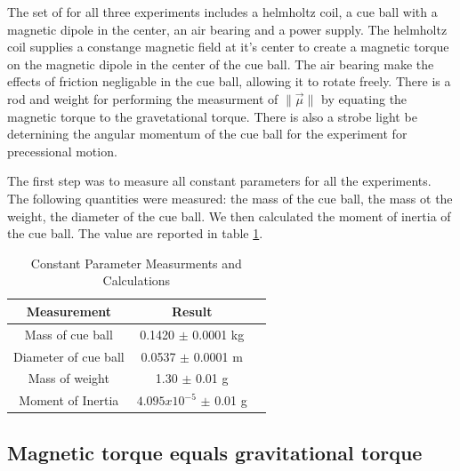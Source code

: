 \documentclass[twocolumn,secnumarabic,amssymb, nobibnotes, aps, pra]{revtex4}
\newcommand{\norm}[1]{\lVert#1\rVert}
\begin{document}
The set of for all three experiments includes a helmholtz coil, a cue ball with a magnetic dipole in the center, an air bearing and a power supply.  The helmholtz coil supplies a constange magnetic field at it's center to create a magnetic torque on the magnetic dipole in the center of the cue ball.  The air bearing make the effects of friction negligable in the cue ball, allowing it to rotate freely.  There is a rod and weight for performing the measurment of $\norm{\vec{\mu}}$ by equating the magnetic torque to the gravetational torque.  There is also a strobe light be deternining the angular momentum of the cue ball for the experiment for precessional motion.

The first step was to measure all constant parameters for all the experiments.  The following quantities were measured: the mass of the cue ball, the mass ot the weight, the diameter of the cue ball.  We then calculated the moment of inertia of the cue ball.  The value are reported in table \ref{tab:params}. 

\begin{table} [h]  %
\caption{Constant Parameter Measurments and Calculations}      %
\centering              %
\begin{tabular}{ccc} %
\hline\hline %
  Measurement & Result   \\
\hline %
Mass of cue ball & 0.1420 $\pm$ 0.0001 kg \\
Diameter of cue ball & 0.0537 $\pm$ 0.0001 m  \\
Mass of weight & 1.30 $\pm$ 0.01 g  \\
Moment of Inertia & $4.095 x 10^{-5}$ $\pm$ 0.01 g  \\



\hline %
\end{tabular}
\label{tab:params}
\end{table}

\subsection{Magnetic torque equals gravitational torque}
\end{document}

